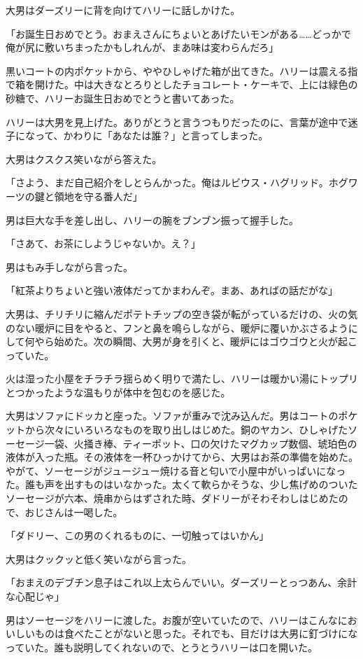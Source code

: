 \documentclass[10pt,a4paper]{article}
\begin{document}
\begin{CJK}{UTF8}{min}
大男はダーズリーに背を向けてハリーに話しかけた。

「お誕生日おめでとう。おまえさんにちょいとあげたいモンがある……どっかで俺が尻に敷いちまったかもしれんが、まあ味は変わらんだろ」

黒いコートの内ポケットから、ややひしゃげた箱が出てきた。ハリーは震える指で箱を開けた。中は大きなとろりとしたチョコレート・ケーキで、上には緑色の砂糖で、ハリーお誕生日おめでとうと書いてあった。

ハリーは大男を見上げた。ありがとうと言うつもりだったのに、言葉が途中で迷子になって、かわりに「あなたは誰？」と言ってしまった。

大男はクスクス笑いながら答えた。

「さよう、まだ自己紹介をしとらんかった。俺はルビウス・ハグリッド。ホグワーツの鍵と領地を守る番人だ」

男は巨大な手を差し出し、ハリーの腕をブンブン振って握手した。

「さあて、お茶にしようじゃないか。え？」

男はもみ手しながら言った。

「紅茶よりちょいと強い液体だってかまわんぞ。まあ、あればの話だがな」

大男は、チリチリに縮んだポテトチップの空き袋が転がっているだけの、火の気のない暖炉に目をやると、フンと鼻を鳴らしながら、暖炉に覆いかぶさるようにして何やら始めた。次の瞬間、大男が身を引くと、暖炉にはゴウゴウと火が起こっていた。

火は湿った小屋をチラチラ揺らめく明りで満たし、ハリーは暖かい湯にトップリとつかったような温もりが体中を包むのを感じた。

大男はソファにドッカと座った。ソファが重みで沈み込んだ。男はコートのポケットから次々にいろいろなものを取り出しはじめた。銅のヤカン、ひしゃげたソーセージ一袋、火掻き棒、ティーポット、口の欠けたマグカップ数個、琥珀色の液体が入った瓶。その液体を一杯ひっかけてから、大男はお茶の準備を始めた。やがて、ソーセージがジュージュー焼ける音と匂いで小屋中がいっぱいになった。誰も声を出すものはいなかった。太くて軟らかそうな、少し焦げめのついたソーセージが六本、焼串からはずされた時、ダドリーがそわそわしはじめたので、おじさんは一喝した。

「ダドリー、この男のくれるものに、一切触ってはいかん」

大男はクックッと低く笑いながら言った。

「おまえのデブチン息子はこれ以上太らんでいい。ダーズリーとっつあん、余計な心配じゃ」

男はソーセージをハリーに渡した。お腹が空いていたので、ハリーはこんなにおいしいものは食べたことがないと思った。それでも、目だけは大男に釘づけになっていた。誰も説明してくれないので、とうとうハリーは口を開いた。


\end{CJK}
\end{document}
